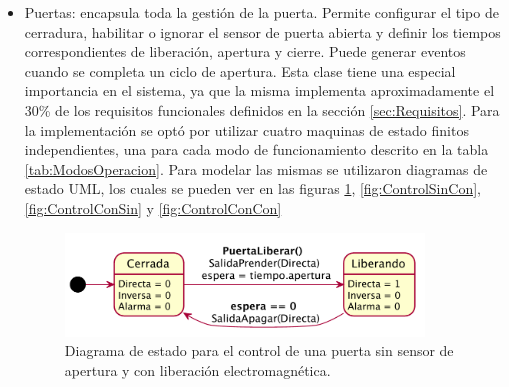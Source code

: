 \begin{itemize}
	\item Puertas: encapsula toda la gestión de la puerta. Permite configurar el tipo de cerradura, habilitar o ignorar el sensor de puerta abierta y definir los tiempos correspondientes de liberación, apertura y cierre. Puede generar eventos cuando se completa un ciclo de apertura. Esta clase tiene una especial importancia en el sistema, ya que la misma implementa aproximadamente el 30\% de los requisitos funcionales definidos en la sección \ref{sec:Requisitos}. Para la implementación se optó por utilizar cuatro maquinas de estado finitos independientes, una para cada modo de funcionamiento descrito en la tabla \ref{tab:ModosOperacion}. Para modelar las mismas se utilizaron diagramas de estado UML, los cuales se pueden ver en las figuras \ref{fig:ControlSinSin}, \ref{fig:ControlSinCon}, \ref{fig:ControlConSin} y \ref{fig:ControlConCon}

\begin{figure}[H]
	\centering
	\includegraphics[width=0.9\textwidth]{Figures/PNK-DE001.pdf}
	\caption[Diagrama de estados con cerradura electromagnética y sin sensor]{Diagrama de estado para el control de una puerta sin sensor de apertura y con liberación electromagnética.}
	\label{fig:ControlSinSin}
\end{figure}


\end{itemize}
